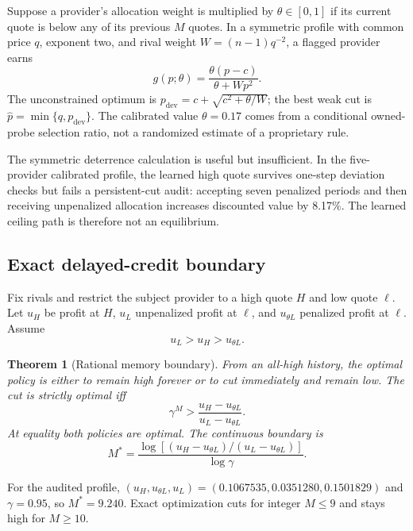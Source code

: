 \documentclass[11pt]{article}
\newtheorem{theorem}{Theorem}
\newcommand{\1}{\mathbf{1}}
\begin{document}
Suppose a provider's allocation weight is multiplied by $\theta\in[0,1]$ if
its current quote is below any of its previous $M$ quotes.  In a symmetric
profile with common price $q$, exponent two, and rival weight
$W=(n-1)q^{-2}$, a flagged provider earns
\[
  g(p;\theta)=\frac{\theta(p-c)}{\theta+Wp^2}.
\]
The unconstrained optimum is
$p_{\mathrm{dev}}=c+\sqrt{c^2+\theta/W}$; the best weak cut is
$\widehat p=\min\{q,p_{\mathrm{dev}}\}$.  The calibrated value
$\theta=0.17$ comes from a conditional owned-probe selection ratio, not a
randomized estimate of a proprietary rule.

The symmetric deterrence calculation is useful but insufficient.  In the
five-provider calibrated profile, the learned high quote survives one-step
deviation checks but fails a persistent-cut audit: accepting seven penalized
periods and then receiving unpenalized allocation increases discounted value
by 8.17\%.  The learned ceiling path is therefore not an equilibrium.

\subsection{Exact delayed-credit boundary}

Fix rivals and restrict the subject provider to a high quote $H$ and low quote
$\ell$.  Let $u_H$ be profit at $H$, $u_L$ unpenalized profit at $\ell$, and
$u_{\theta L}$ penalized profit at $\ell$.  Assume
\begin{equation}
  u_L>u_H>u_{\theta L}.
  \label{eq:ordering}
\end{equation}

\begin{theorem}[Rational memory boundary]
From an all-high history, the optimal policy is either to remain high forever
or to cut immediately and remain low.  The cut is strictly optimal iff
\begin{equation}
  \gamma^M>
  \frac{u_H-u_{\theta L}}{u_L-u_{\theta L}}.
  \label{eq:boundary}
\end{equation}
At equality both policies are optimal.  The continuous boundary is
\[
  M^*=\frac{\log[(u_H-u_{\theta L})/(u_L-u_{\theta L})]}
  {\log\gamma}.
\]
\label{thm:boundary}
\end{theorem}

For the audited profile,
$(u_H,u_{\theta L},u_L)=(0.1067535,0.0351280,0.1501829)$ and
$\gamma=0.95$, so $M^*=9.240$.  Exact optimization cuts for integer
$M\le9$ and stays high for $M\ge10$.
\end{document}
